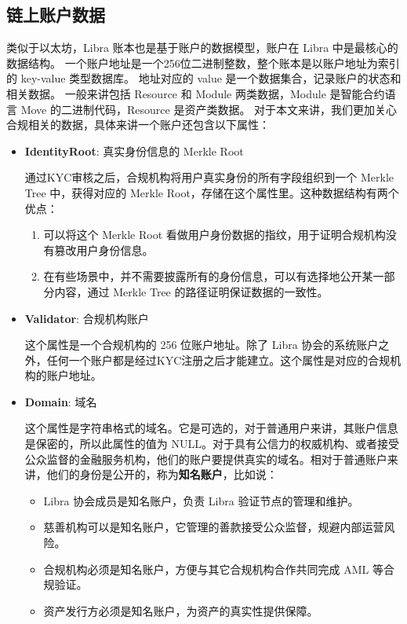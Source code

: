 \subsection{链上账户数据}
类似于以太坊，Libra 账本也是基于账户的数据模型，账户在 Libra 中是最核心的数据结构。
一个账户地址是一个256位二进制整数，整个账本是以账户地址为索引的 key-value 类型数据库。
地址对应的 value 是一个数据集合，记录账户的状态和相关数据。
一般来讲包括 Resource 和 Module 两类数据，Module 是智能合约语言 Move 的二进制代码，Resource 是资产类数据。
对于本文来讲，我们更加关心合规相关的数据，具体来讲一个账户还包含以下属性：

\begin{itemize}
    \item[\dag] \textbf{IdentityRoot}: 真实身份信息的 Merkle Root

    通过KYC审核之后，合规机构将用户真实身份的所有字段组织到一个 Merkle Tree 中，获得对应的 Merkle Root，存储在这个属性里。这种数据结构有两个优点：
    \begin{enumerate}
        \item 可以将这个 Merkle Root 看做用户身份数据的指纹，用于证明合规机构没有篡改用户身份信息。
        \item 在有些场景中，并不需要披露所有的身份信息，可以有选择地公开某一部分内容，通过 Merkle Tree 的路径证明保证数据的一致性。
    \end{enumerate}

    \item[\dag] \textbf{Validator}: 合规机构账户

    这个属性是一个合规机构的 256 位账户地址。除了 Libra 协会的系统账户之外，任何一个账户都是经过KYC注册之后才能建立。这个属性是对应的合规机构的账户地址。%

    \item[\dag] \textbf{Domain}: 域名

    这个属性是字符串格式的域名。它是可选的，对于普通用户来讲，其账户信息是保密的，所以此属性的值为 NULL。对于具有公信力的权威机构、或者接受公众监督的金融服务机构，他们的账户要提供真实的域名。相对于普通账户来讲，他们的身份是公开的，称为\textbf{知名账户}，比如说：

    \begin{itemize}
        \item Libra 协会成员是知名账户，负责 Libra 验证节点的管理和维护。
        \item 慈善机构可以是知名账户，它管理的善款接受公众监督，规避内部运营风险。
        \item 合规机构必须是知名账户，方便与其它合规机构合作共同完成 AML 等合规验证。
        \item 资产发行方必须是知名账户，为资产的真实性提供保障。
    \end{itemize}
\end{itemize}

